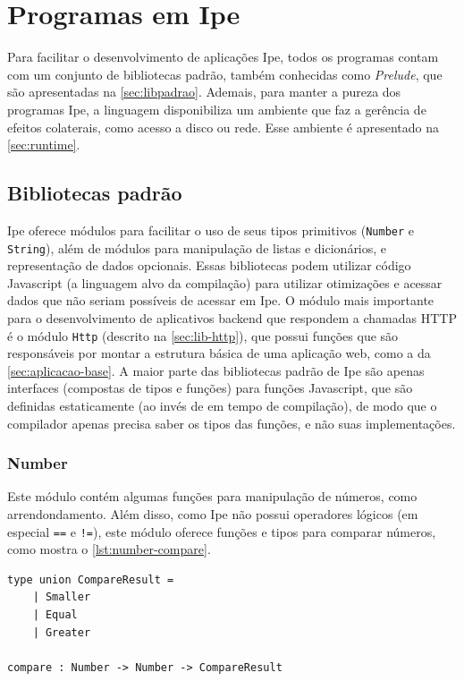 
\chapter{Programas em Ipe}\label{chapter:programas-em-ipe}

Para facilitar o desenvolvimento de aplicações Ipe, todos os programas contam com um conjunto de
bibliotecas padrão, também conhecidas como \textit{Prelude}, que são apresentadas na
\autoref{sec:libpadrao}. Ademais, para manter a pureza dos programas Ipe, a linguagem disponibiliza
um ambiente que faz a gerência de efeitos colaterais, como acesso a disco ou rede. Esse ambiente
é apresentado na \autoref{sec:runtime}.

\section{Bibliotecas padrão}\label{sec:libpadrao}

Ipe oferece módulos para facilitar o uso de seus tipos primitivos (\texttt{Number}
e \texttt{String}), além de módulos para manipulação de listas e dicionários, e
representação de dados opcionais. Essas bibliotecas podem utilizar código Javascript
(a linguagem alvo da compilação) para utilizar otimizações e acessar dados que
não seriam possíveis de acessar em Ipe. O módulo mais importante para o desenvolvimento de
aplicativos backend que respondem a chamadas HTTP é o módulo \texttt{Http} (descrito na
\autoref{sec:lib-http}), que possui funções que são responsáveis por montar a estrutura básica de
uma aplicação web, como a da \autoref{sec:aplicacao-base}. A maior parte das bibliotecas padrão de
Ipe são apenas interfaces (compostas de tipos e funções) para funções Javascript, que são definidas
estaticamente (ao invés de em tempo de compilação), de modo que o compilador apenas precisa saber os
tipos das funções, e não suas implementações.

\subsection{Number}

Este módulo contém algumas funções para manipulação de números, como arrendondamento.
Além disso, como Ipe não possui operadores lógicos (em especial \texttt{==} e \texttt{!=}),
este módulo oferece funções e tipos para comparar números, como mostra o \autoref{lst:number-compare}.

\begin{lstlisting}[label={lst:number-compare},caption={Comparação de números em Ipe}]
type union CompareResult =
    | Smaller
    | Equal
    | Greater

compare : Number -> Number -> CompareResult
\end{lstlisting}

